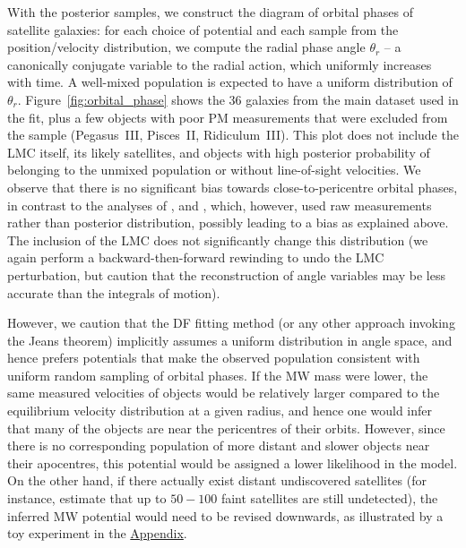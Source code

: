 \documentclass[usenatbib,fleqn]{mnras}
\begin{document}
With the posterior samples, we construct the diagram of orbital phases of satellite galaxies: for each choice of potential and each sample from the position/velocity distribution, we compute the radial phase angle $\theta_r$ -- a canonically conjugate variable to the radial action, which uniformly increases with time. A well-mixed population is expected to have a uniform distribution of $\theta_r$. Figure~\ref{fig:orbital_phase} shows the 36 galaxies from the main dataset used in the fit, plus a few objects with poor PM measurements that were excluded from the sample (Pegasus~III, Pisces~II, Ridiculum~III). This plot does not include the LMC itself, its likely satellites, and objects with high posterior probability of belonging to the unmixed population or without line-of-sight velocities. We observe that there is no significant bias towards close-to-pericentre orbital phases, in contrast to the analyses of \citet{Simon2018}, \citet{Fritz2018} and \citet{Li2021}, which, however, used raw measurements rather than posterior distribution, possibly leading to a bias as explained above. The inclusion of the LMC does not significantly change this distribution (we again perform a backward-then-forward rewinding to undo the LMC perturbation, but caution that the reconstruction of angle variables may be less accurate than the integrals of motion). 

However, we caution that the DF fitting method (or any other approach invoking the Jeans theorem) implicitly assumes a uniform distribution in angle space, and hence prefers potentials that make the observed population consistent with uniform random sampling of orbital phases. If the MW mass were lower, the same measured velocities of objects would be relatively larger compared to the equilibrium velocity distribution at a given radius, and hence one would infer that many of the objects are near the pericentres of their orbits. However, since there is no corresponding population of more distant and slower objects near their apocentres, this potential would be assigned a lower likelihood in the model. On the other hand, if there actually exist distant undiscovered satellites (for instance, \citealt{Koposov2008} estimate that up to $50-100$ faint satellites are still undetected), the inferred MW potential would need to be revised downwards, as illustrated by a toy experiment in the \hyperref[sec:potential_bias]{Appendix}.
\end{document}
